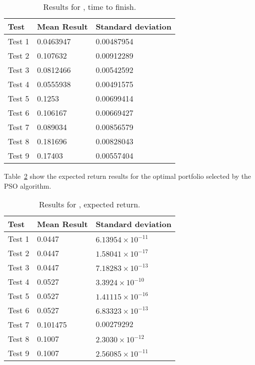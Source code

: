         \begin{table}[H]
          \setlength{\extrarowheight}{2.0pt}
          \begin{tabular}{|l|l|l|}
            \hline
            Test & Mean Result & Standard deviation \\
            \hline
            Test 1 & 0.0463947 & 0.00487954 \\
            \hline
            Test 2 & 0.107632 & 0.00912289 \\
            \hline
            Test 3 & 0.0812466 & 0.00542592 \\
            \hline
            Test 4 & 0.0555938 & 0.00491575 \\
            \hline
            Test 5 & 0.1253 & 0.00699414 \\
            \hline
            Test 6 & 0.106167 & 0.00669427 \\
            \hline
            Test 7 & 0.089034 & 0.00856579 \\
            \hline
            Test 8 & 0.181696 & 0.00828043 \\
            \hline
            Test 9 & 0.17403 & 0.00557404 \\
            \hline
          \end{tabular}
          \caption{Results for , time to finish.}
          \label{table:time_results}
        \end{table}
      Table~\ref{table:expect_return_results} show the expected return results for the optimal portfolio selected by the PSO algorithm.
        \begin{table}[H]
          \setlength{\extrarowheight}{2.0pt}
          \begin{tabular}{|l|l|l|}
            \hline
            Test & Mean Result & Standard deviation \\
            \hline
            Test 1 & 0.0447 & $6.13954\times10^{-11}$ \\
            \hline
            Test 2 & 0.0447 & $1.58041\times10^{-17}$ \\
            \hline
            Test 3 & 0.0447 & $7.18283\times10^{-13}$ \\
            \hline
            Test 4 & 0.0527 & $3.3924\times10^{-10}$ \\
            \hline
            Test 5 & 0.0527 & $1.41115\times10^{-16}$ \\
            \hline
            Test 6 & 0.0527 & $6.83323\times10^{-13}$ \\
            \hline
            Test 7 & 0.101475 & $0.00279292$ \\
            \hline
            Test 8 & 0.1007 & $2.3030\times10^{-12}$ \\
            \hline
            Test 9 & 0.1007 & $2.56085\times10^{-11}$ \\
            \hline
          \end{tabular}
          \caption{Results for , expected return.}
          \label{table:expect_return_results}
        \end{table}

